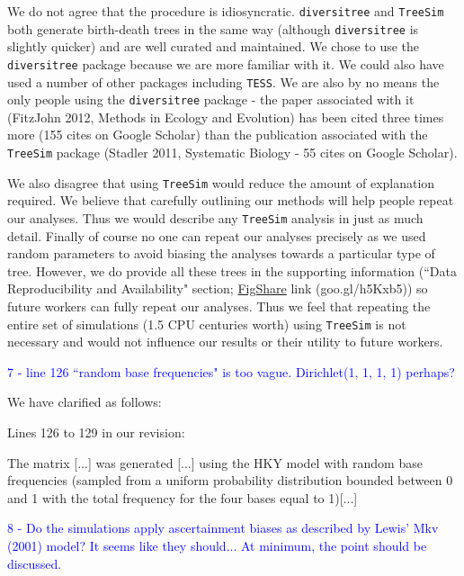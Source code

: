 \documentclass[11pt]{letter}
\begin{document}
\begin{letter}{}
We do not agree that the procedure is idiosyncratic. \texttt{diversitree} and \texttt{TreeSim} both generate birth-death trees in the same way (although \texttt{diversitree} is slightly quicker) and are well curated and maintained. We chose to use the \texttt{diversitree} package because we are more familiar with it. We could also have used a number of other packages including \texttt{TESS}. We are also by no means the only people using the \texttt{diversitree} package - the paper associated with it (FitzJohn 2012, Methods in Ecology and Evolution) has been cited three times more (155 cites on Google Scholar) than the publication associated with the \texttt{TreeSim} package (Stadler 2011, Systematic Biology - 55 cites on Google Scholar).

We also disagree that using \texttt{TreeSim} would reduce the amount of explanation required. We believe that carefully outlining our methods will help people repeat our analyses. Thus we would describe any \texttt{TreeSim} analysis in just as much detail.
Finally of course no one can repeat our analyses precisely as we used random parameters to avoid biasing the analyses towards a particular type of tree. However, we do provide all these trees in the supporting information (``Data Reproducibility and Availability" section; \href{http://figshare.com/articles/Effect_of_missing_data_on_topological_inference_using_a_total_evidence_approach/1306861}{FigShare} link (goo.gl/h5Kxb5)) so future workers can fully repeat our analyses. Thus we feel that repeating the entire set of simulations (1.5 CPU centuries worth) using \texttt{TreeSim} is not necessary and would not influence our results or their utility to future workers.


\textcolor{blue}{7 - line 126 ``random base frequencies" is too vague. Dirichlet(1, 1, 1, 1) perhaps?}

We have clarified as follows:

Lines 126 to 129 in our revision:

\hfill\begin{minipage}{\dimexpr\textwidth-1cm}
The matrix [...] was generated [...] using the HKY model with random base frequencies (sampled from a uniform probability distribution bounded between 0 and 1 with the total frequency for the four bases equal to 1)[...]
\end{minipage}


\textcolor{blue}{8 - Do the simulations apply ascertainment biases as described by Lewis' Mkv (2001) model? It seems like they should... At minimum, the point should be discussed.}


\end{letter}
\end{document}

